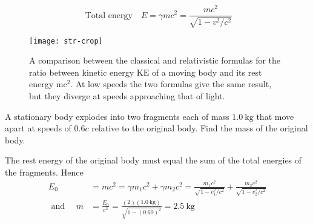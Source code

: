    

 
 \begin{equation}
\text{ Total energy} \quad
 E=\gamma m c^{2}=\frac{m c^{2}}{\sqrt{1-v^{2} / c^{2}}}
 \end{equation}
 \begin{figure}[H]
 	\centering
 	\texttt{[image: str-crop]}
 	\caption{ A comparison between the classical and relativistic formulas for the ratio between kinetic energy $\mathrm{KE}$ of a moving body and its rest energy $\mathrm{mc}^{2}$. At low speeds the two formulas give the same result, but they diverge at speeds approaching that of light.}
 	\label{}
 \end{figure}
\begin{exercise}
	A stationary body explodes into two fragments each of mass $1.0 \mathrm{~kg}$ that move apart at speeds of $0.6 c$ relative to the original body. Find the mass of the original body.
\end{exercise}
\begin{answer}
	The rest energy of the original body must equal the sum of the total energies of the fragments. Hence
	\begin{align*}
	E_{0}&=m c^{2}=\gamma m_{1} c^{2}+\gamma m_{2} c^{2}=\frac{m_{1} c^{2}}{\sqrt{1-v_{1}^{2} / c^{2}}}+\frac{m_{2} c^{2}}{\sqrt{1-v_{2}^{2} / c^{2}}}\\
\text{	and }\quad
	m&=\frac{E_{0}}{c^{2}}=\frac{(2)(1.0 \mathrm{~kg})}{\sqrt{1-(0.60)^{2}}}=2.5 \mathrm{~kg}
	\end{align*}
\end{answer}
